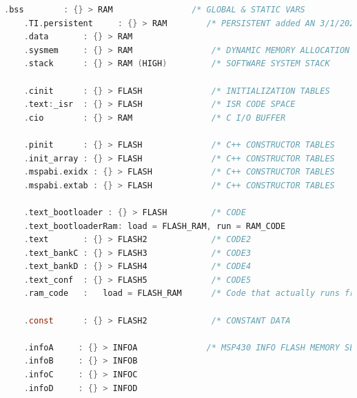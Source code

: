 \documentclass[LaM,binding=0.6cm]{../sapthesis}
\begin{document}
\begin{lstlisting}[language=C]
    .bss        : {} > RAM                /* GLOBAL & STATIC VARS              */
    .TI.persistent     : {} > RAM        /* PERSISTENT added AN 3/1/2021    */
    .data       : {} > RAM
    .sysmem     : {} > RAM                /* DYNAMIC MEMORY ALLOCATION AREA    */
    .stack      : {} > RAM (HIGH)         /* SOFTWARE SYSTEM STACK             */

	.cinit      : {} > FLASH              /* INITIALIZATION TABLES             */
	.text:_isr  : {} > FLASH              /* ISR CODE SPACE                    */
    .cio        : {} > RAM                /* C I/O BUFFER                      */

    .pinit      : {} > FLASH              /* C++ CONSTRUCTOR TABLES            */
    .init_array : {} > FLASH              /* C++ CONSTRUCTOR TABLES            */
    .mspabi.exidx : {} > FLASH            /* C++ CONSTRUCTOR TABLES            */
    .mspabi.extab : {} > FLASH            /* C++ CONSTRUCTOR TABLES            */

    .text_bootloader : {} > FLASH		  /* CODE                              */
    .text_bootloaderRam: load = FLASH_RAM, run = RAM_CODE
    .text       : {} > FLASH2			  /* CODE2                             */
    .text_bankC : {} > FLASH3		      /* CODE3                             */
    .text_bankD : {} > FLASH4		      /* CODE4                             */
    .text_conf  : {} > FLASH5		  	  /* CODE5                             */
    .ram_code	:	load = FLASH_RAM	  /* Code that actually runs from RAM  */

    .const      : {} > FLASH2     		  /* CONSTANT DATA                     */

    .infoA     : {} > INFOA              /* MSP430 INFO FLASH MEMORY SEGMENTS */
    .infoB     : {} > INFOB
    .infoC     : {} > INFOC
    .infoD     : {} > INFOD




\end{lstlisting}
\end{document}
